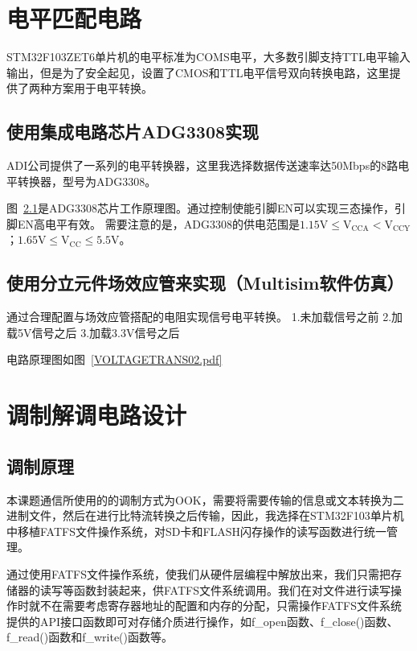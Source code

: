 \section{ 电平匹配电路}
STM32F103ZET6单片机的电平标准为COMS电平，大多数引脚支持TTL电平输入输出，但是为了安全起见，设置了CMOS和TTL电平信号双向转换电路，这里提供了两种方案用于电平转换。

\subsection{使用集成电路芯片ADG3308实现}
ADI公司提供了一系列的电平转换器，这里我选择数据传送速率达50Mbps的8路电平转换器，型号为ADG3308。

图~\ref{}是ADG3308芯片工作原理图。通过控制使能引脚EN可以实现三态操作，引脚EN高电平有效。
需要注意的是，ADG3308的供电范围是$ 1.15 \mathrm { V } \leq \mathrm { V } _ { \mathrm { CCA } } < \mathrm { V } _ { \mathrm { CCY} } $；$ 1.65 \mathrm { V } \leq \mathrm { V } _ { \mathrm { CC } } \leq 5.5 \mathrm { V } $。
\subsection{使用分立元件场效应管来实现（Multisim软件仿真）}
通过合理配置与场效应管搭配的电阻实现信号电平转换。
1.未加载信号之前
2.加载5V信号之后
3.加载3.3V信号之后

电路原理图如图~\ref{VOLTAGETRANS02.pdf}


\section{调制解调电路设计}

\subsection{调制原理}
本课题通信所使用的的调制方式为OOK，需要将需要传输的信息或文本转换为二进制文件，然后在进行比特流转换之后传输，因此，我选择在STM32F103单片机中移植FATFS文件操作系统，对SD卡和FLASH闪存操作的读写函数进行统一管理。

通过使用FATFS文件操作系统，使我们从硬件层编程中解放出来，我们只需把存储器的读写等函数封装起来，供FATFS文件系统调用。我们在对文件进行读写操作时就不在需要考虑寄存器地址的配置和内存的分配，只需操作FATFS文件系统提供的API接口函数即可对存储介质进行操作，如f\_open函数、f\_close()函数、f\_read()函数和f\_write()函数等。


